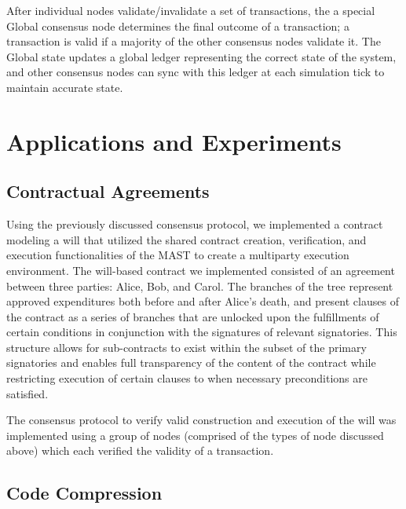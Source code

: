 \documentclass{vldb}
\begin{document}
After individual nodes validate/invalidate a set of transactions, the a special
Global consensus node determines the final outcome of a transaction; a
transaction is valid if a majority of the other consensus nodes validate it.
The Global state updates a global ledger representing the correct state of the
system, and other consensus nodes can sync with this ledger at each simulation
tick to maintain accurate state.

\section{Applications and Experiments}

\subsection{Contractual Agreements}

Using the previously discussed consensus protocol, we implemented a contract
modeling a will that utilized the shared contract creation, verification, and
execution functionalities of the MAST to create a multiparty execution
environment. The will-based contract we implemented consisted of an agreement
between three parties: Alice, Bob, and Carol. The branches of the tree
represent approved expenditures both before and after Alice’s death, and
present clauses of the contract as a series of branches that are unlocked upon
the fulfillments of certain conditions in conjunction with the signatures of
relevant signatories. This structure allows for sub-contracts to exist within
the subset of the primary signatories and enables full transparency of the
content of the contract while restricting execution of certain clauses to when
necessary preconditions are satisfied.

The consensus protocol to verify valid construction and execution of the will
was implemented using a group of nodes (comprised of the types of node
discussed above) which each verified the validity of a transaction.

\subsection{Code Compression}
\end{document}
